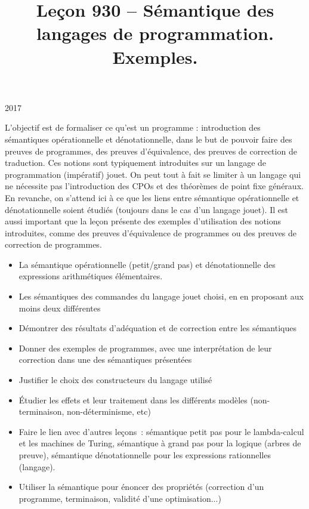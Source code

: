 \documentclass{agregfiche}
\title{Leçon 930 -- Sémantique des langages de programmation. Exemples.}
\begin{document}
\maketitle

\secrapports

\begin{rapport}{2017}

    L’objectif est de formaliser ce qu’est un programme : introduction des
    sémantiques opérationnelle et dénotationnelle, dans le but de pouvoir faire
    des preuves de programmes, des preuves d’équivalence, des preuves de
    correction de traduction. Ces notions sont typiquement introduites sur un
    langage de programmation (impératif) jouet. On peut tout à fait se limiter à
    un langage qui ne nécessite pas l’introduction des CPOs et des théorèmes de
    point fixe généraux. En revanche, on s’attend ici à ce que les liens entre
    sémantique opérationnelle et dénotationnelle soient étudiés (toujours dans le
    cas d’un langage jouet). Il est aussi important que la leçon présente des
    exemples d’utilisation des notions introduites, comme des preuves
    d’équivalence de programmes ou des preuves de correction de programmes.

\end{rapport}

\secindispensables

\begin{itemize}
    \item La sémantique opérationnelle (petit/grand pas) et dénotationnelle
        des expressions arithmétiques élémentaires.
    \item Les sémantiques des commandes du langage jouet choisi, en en proposant 
        aux moins deux différentes
    \item Démontrer des résultats d'adéquation et de correction entre les 
        sémantiques
    \item Donner des exemples de programmes, avec une interprétation de leur 
        correction dans une des sémantiques présentées
    \item Justifier le choix des constructeurs du langage utilisé
    \item Étudier les effets et leur traitement dans les différents modèles 
        (non-terminaison, non-déterminisme, etc)
    \item Faire le lien avec d'autres leçons~: 
        sémantique petit pas pour le lambda-calcul et les machines de Turing,
        sémantique à grand pas pour la logique (arbres de preuve),
        sémantique dénotationnelle pour les expressions rationnelles (langage).
    \item Utiliser la sémantique pour énoncer des propriétés (correction d'un
        programme, terminaison, validité d'une optimisation...)
\end{itemize}
\end{document}

